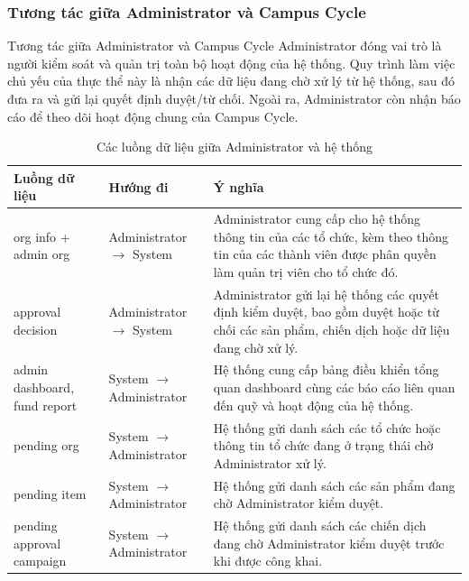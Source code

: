 \documentclass[12pt,a4paper]{report}
\begin{document}
\subsubsection{Tương tác giữa Administrator và Campus Cycle}

Tương tác giữa Administrator và Campus Cycle Administrator đóng vai trò
là người kiểm soát và quản trị toàn bộ hoạt động của hệ thống. Quy trình làm việc
chủ yếu của thực thể này là nhận các dữ liệu đang chờ xử lý từ hệ thống, sau đó
đưa ra và gửi lại quyết định duyệt/từ chối. Ngoài ra, Administrator còn nhận báo
cáo để theo dõi hoạt động chung của Campus Cycle.

\begin{table}[H]
\centering
\caption{Các luồng dữ liệu giữa Administrator và hệ thống}
\label{tab:admin-system-data-flow}

\begin{tabular}{|p{4cm}|p{4cm}|p{7cm}|}
\hline
\textbf{Luồng dữ liệu} & \textbf{Hướng đi} & \textbf{Ý nghĩa} \\
\hline

org info + admin org &
Administrator $\rightarrow$ System &
Administrator cung cấp cho hệ thống thông tin của các tổ chức, kèm theo thông tin của các thành viên được phân quyền làm quản trị viên cho tổ chức đó. \\
\hline

approval decision &
Administrator $\rightarrow$ System &
Administrator gửi lại hệ thống các quyết định kiểm duyệt, bao gồm duyệt hoặc từ chối các sản phẩm, chiến dịch hoặc dữ liệu đang chờ xử lý. \\
\hline

admin dashboard, fund report &
System $\rightarrow$ Administrator &
Hệ thống cung cấp bảng điều khiển tổng quan dashboard cùng các báo cáo liên quan đến quỹ và hoạt động của hệ thống. \\
\hline

pending org &
System $\rightarrow$ Administrator &
Hệ thống gửi danh sách các tổ chức hoặc thông tin tổ chức đang ở trạng thái chờ Administrator xử lý. \\
\hline

pending item &
System $\rightarrow$ Administrator &
Hệ thống gửi danh sách các sản phẩm đang chờ Administrator kiểm duyệt. \\
\hline

pending approval campaign &
System $\rightarrow$ Administrator &
Hệ thống gửi danh sách các chiến dịch đang chờ Administrator kiểm duyệt trước khi được công khai. \\
\hline

\end{tabular}
\end{table}
\end{document}

